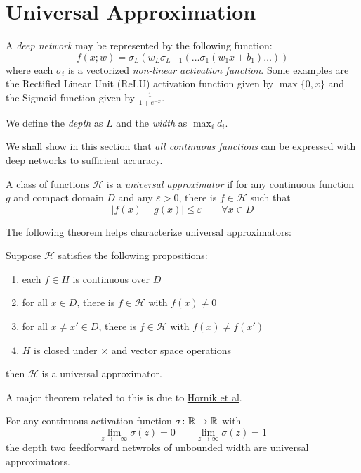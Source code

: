 \section{Universal Approximation}
A \textit{deep network} may be represented by the following function:
\begin{equation*}
	f(x; w) = \sigma_L(w_L\sigma_{L-1}(\ldots\sigma_1(w_1x + b_1)\ldots))
\end{equation*}
where each $\sigma_i$ is a vectorized \textit{non-linear activation function}. Some examples are the Rectified Linear Unit (ReLU) activation function given by $\max\{0,x\}$ and the Sigmoid function given by $\frac{1}{1 + e^{-x}}$.

We define the \textit{depth} as $L$ and the \textit{width} as $\max_{i}d_i$.

We shall show in this section that \textit{all continuous functions} can be expressed with deep networks to sufficient accuracy.

\begin{definition}
	A class of functions $\mathcal{H}$ is a \textit{universal approximator} if for any continuous function $g$ and compact domain $D$ and any $\varepsilon > 0$, there is $f\in\mathcal{H}$ such that 
	\begin{equation*}
		|f(x) - g(x)|\le\varepsilon \qquad \forall x\in D
	\end{equation*}
\end{definition}

The following theorem helps characterize universal approximators:
\begin{theorem}
	Suppose $\mathcal{H}$ satisfies the following propositions:
	\begin{enumerate}
		\item each $f\in H$ is continuous over $D$ 
		\item for all $x\in D$, there is $f\in\mathcal{H}$ with $f(x)\ne0$
		\item for all $x\ne x'\in D$, there is $f\in\mathcal{H}$ with $f(x)\ne f(x')$
		\item $H$ is closed under $\times$ and vector space operations
	\end{enumerate}
	then $\mathcal{H}$ is a universal approximator.
\end{theorem}

A major theorem related to this is due to \href{https://www.cs.cmu.edu/~epxing/Class/10715/reading/Kornick_et_al.pdf}{Hornik et al}.
\begin{theorem}[Hornik et al. 1989]
	For any continuous activation function $\sigma\colon\mathbb{R}\to\mathbb{R}$ with 
	\begin{equation*}
		\lim_{z\to-\infty}\sigma(z) = 0 \qquad \lim_{z\to\infty}\sigma(z) = 1
	\end{equation*}
	the depth two feedforward netwroks of unbounded width are universal approximators.
\end{theorem}

